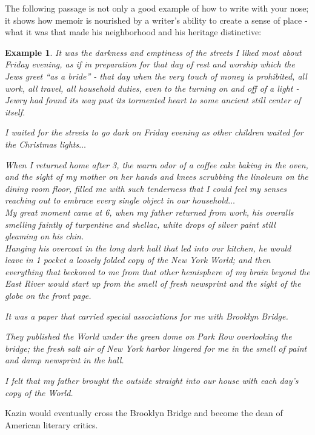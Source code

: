 \documentclass{book}
\numberwithin{equation}{section}
\newtheorem{example}{Example}[chapter]
\begin{document}
The following passage is not only a good example of how to write with your nose; it shows how memoir is nourished by a writer's ability to create a sense of place - what it was that made his neighborhood and his heritage distinctive:
\begin{example}
    It was the darkness and emptiness of the streets I liked most about Friday evening, as if in preparation for that day of rest and worship which the Jews greet ``as a bride'' - that day when the very touch of money is prohibited, all work, all travel, all household duties, even to the turning on and off of a light - Jewry had found its way past its tormented heart to some ancient still center of itself.
    
    I waited for the streets to go dark on Friday evening as other children waited for the Christmas lights$\ldots$
    
    When I returned home after 3, the warm odor of a coffee cake baking in the oven, and the sight of my mother on her hands and knees scrubbing the linoleum on the dining room floor, filled me with such tenderness that I could feel my senses reaching out to embrace every single object in our household$\ldots$
    \\
    
    My great moment came at 6, when my father returned from work, his overalls smelling faintly of turpentine and shellac, white drops of silver paint still gleaming on his chin.
    \\
    
    Hanging his overcoat in the long dark hall that led into our kitchen, he would leave in 1 pocket a loosely folded copy of the New York \textit{World}; and then everything that beckoned to me from that other hemisphere of my brain beyond the East River would start up from the smell of fresh newsprint and the sight of the globe on the front page.
    
    It was a paper that carried special associations for me with Brooklyn Bridge.
    
    They published the \textit{World} under the green dome on Park Row overlooking the bridge; the fresh salt air of New York harbor lingered for me in the smell of paint and damp newsprint in the hall.
    
    I felt that my father brought the outside straight into our house with each day's copy of the \textit{World}.
\end{example}
Kazin would eventually cross the Brooklyn Bridge and become the dean of American literary critics.
\end{document}
